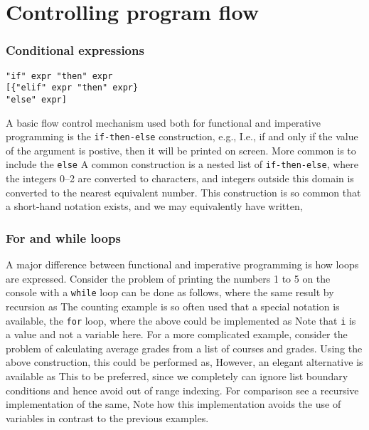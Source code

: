 \chapter{Controlling program flow}

\subsection{Conditional expressions}
\begin{lstlisting}[language=EBNF]
"if" expr "then" expr 
[{"elif" expr "then" expr}
"else" expr]
\end{lstlisting}
A basic flow control mechanism used both for functional and imperative programming is the \texttt{if-then-else} construction, e.g.,
I.e., if and only if the value of the argument is postive, then it will be printed on screen. More common is to include the \texttt{else} 
A common construction is a nested list of \texttt{if-then-else},
where the integers 0--2 are converted to characters, and integers outside this domain is converted to the nearest equivalent number. This construction is so common that a short-hand notation exists, and we may equivalently have written,

\subsection{For and while loops}
A major difference between functional and imperative programming is how loops are expressed. Consider the problem of printing the numbers 1 to 5 on the console with a \texttt{while} loop can be done as follows,
where the same result by recursion as
The counting example is so often used that a special notation is available, the \texttt{for} loop, where the above could be implemented as
Note that \texttt{i} is a value and not a variable here. For a more complicated example, consider the problem of calculating average grades from a list of courses and grades. Using the above construction, this could be performed as,
However, an elegant alternative is available as
This to be preferred, since we completely can ignore list boundary conditions and hence avoid out of range indexing. For comparison see a recursive implementation of the same,
Note how this implementation avoids the use of variables in contrast to the previous examples.


